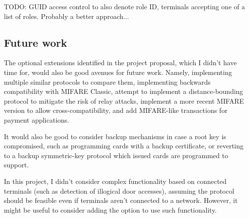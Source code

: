 \documentclass[12pt,a4paper]{article}
\begin{document}
TODO: GUID access control to also denote role ID, terminals accepting one of a list of roles. Probably a better approach...

\subsection{Future work}

The optional extensions identified in the project proposal, which I didn't have time for, would also be good avenues for future work. Namely, implementing multiple similar protocols to compare them, implementing backwards compatibility with MIFARE Classic, attempt to implement a distance-bounding protocol to mitigate the risk of relay attacks, implement a more recent MIFARE version to allow cross-compatibility, and add MIFARE-like transactions for payment applications.

It would also be good to consider backup mechanisms in case a root key is compromised, such as programming cards with a backup certificate, or reverting to a backup symmetric-key protocol which issued cards are programmed to support.

In this project, I didn't consider complex functionality based on connected terminals (such as detection of illogical door accesses), assuming the protocol should be feasible even if terminals aren't connected to a network. However, it might be useful to consider adding the option to use such functionality.





\pagebreak

\appendix





\pagebreak

\end{document}

